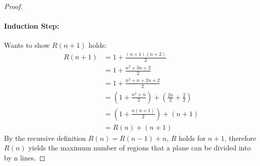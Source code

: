 \documentclass{article}
\begin{document}
\begin{enumerate} [label=\textbf{\arabic*}.]
\begin{enumerate} [label=\textbf{\alph*}.]
\begin{proof}
					\paragraph{Induction Step: }Wants to show $R(n+1)$ holds:
						\begin{align*}
							R(n+1) &= 1 + \frac{(n+1)(n+2)}{2}\\
							       &= 1 + \frac{n^2+3n+2}{2}\\
							       &= 1 + \frac{n^2+n+2n+2}{2}\\
							       &= \left(1 + \frac{n^2+n}{2}\right) + \left(\frac{2n}{2} +
										 \frac{2}{2}\right)\\
							       &= \left(1 + \frac{n(n+1)}{2} \right) + (n + 1)\\
										 &= R(n) + (n + 1)
						\end{align*}
					By the recursive definition $R(n) = R(n-1) + n$, $R$ holds for $n+1$,
					therefore $R(n)$ yields the maximum number of regions that a plane can
					be divided into by n lines.
				\end{proof}
		\end{enumerate}
\end{enumerate}
\end{document}
